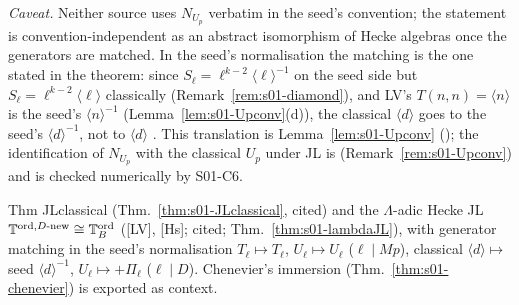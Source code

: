 \noindent\emph{Caveat.} Neither source uses $N_{U_p}$ verbatim in the seed's convention; the statement is
convention-independent as an abstract isomorphism of Hecke algebras once the generators are matched.
In the seed's normalisation the matching is the one stated in the theorem: since $S_\ell=\ell^{k-2}\langle\ell\rangle^{-1}$ on the seed side
but $S_\ell=\ell^{k-2}\langle\ell\rangle$ classically (Remark~\ref{rem:s01-diamond}), and LV's $T(n,n)=\langle n\rangle$ is the seed's
$\langle n\rangle^{-1}$ (Lemma~\ref{lem:s01-Upconv}(d)), the classical $\langle d\rangle$ goes to the seed's $\langle d\rangle^{-1}$, not to $\langle d\rangle$
. This translation is Lemma~\ref{lem:s01-Upconv} (\stpmc); the identification of $N_{U_p}$ with the classical $U_p$ under JL is
\stexp{} (Remark~\ref{rem:s01-Upconv}) and is checked numerically by S01-C6.

\begin{interface}\label{if:s01-targets}
Thm JLclassical (Thm.~\ref{thm:s01-JLclassical}, cited) and the $\Lambda$-adic Hecke JL $\mathbb{T}^{\mathrm{ord},D\text{-new}}\cong\mathbb{T}^{\mathrm{ord}}_B$
([LV], [Hs]; cited; Thm.~\ref{thm:s01-lambdaJL}), with generator matching in the seed's normalisation
$T_\ell\mapsto T_\ell$, $U_\ell\mapsto U_\ell$ ($\ell\mid Mp$), classical $\langle d\rangle\mapsto$ seed $\langle d\rangle^{-1}$, $U_\ell\mapsto+\Pi_\ell$ ($\ell\mid D$). Chenevier's immersion (Thm.~\ref{thm:s01-chenevier}) is exported as context.
\end{interface}
